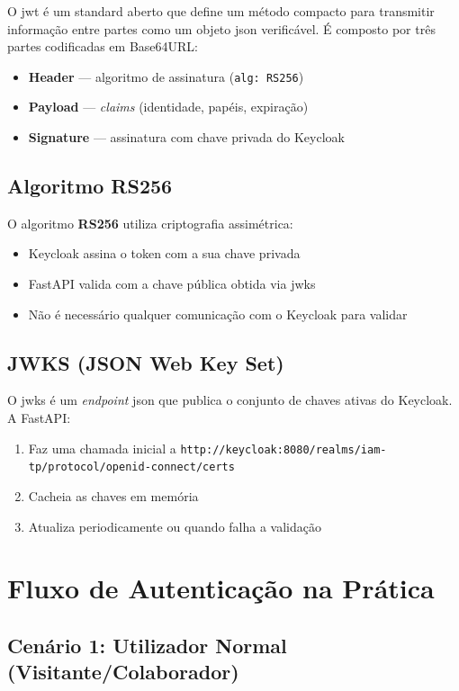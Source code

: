 O \gls{jwt} \cite{RFC7519} é um standard aberto que define um método compacto para transmitir informação entre partes como um objeto \gls{json} verificável. É composto por três partes codificadas em Base64URL:

\begin{itemize}
  \item \textbf{Header} — algoritmo de assinatura (\texttt{alg: RS256})
  \item \textbf{Payload} — \textit{claims} (identidade, papéis, expiração)
  \item \textbf{Signature} — assinatura com chave privada do Keycloak
\end{itemize}

\subsection{Algoritmo RS256}

O algoritmo \textbf{RS256} utiliza criptografia assimétrica:
\begin{itemize}
  \item Keycloak assina o token com a sua chave privada
  \item FastAPI valida com a chave pública obtida via \gls{jwks}
  \item Não é necessário qualquer comunicação com o Keycloak para validar
\end{itemize}

\subsection{JWKS (JSON Web Key Set)}

O \gls{jwks} \cite{RFC7517} é um \textit{endpoint} \gls{json} que publica o conjunto de chaves ativas do Keycloak. A FastAPI:
\begin{enumerate}
  \item Faz uma chamada inicial a \texttt{http://keycloak:8080/realms/iam-tp/protocol/openid-connect/certs}
  \item Cacheia as chaves em memória
  \item Atualiza periodicamente ou quando falha a validação
\end{enumerate}

\section{Fluxo de Autenticação na Prática}

\subsection{Cenário 1: Utilizador Normal (Visitante/Colaborador)}

